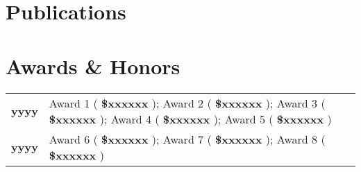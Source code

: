 \documentclass[a4,10pt]{article}
\newcommand{\hskills}[1]{
\textbf{\bfseries #1} }
\begin{document}
\section{Publications} 
\renewcommand\refname{\vskip -1.5em}
\nocite{*}
\printbibliography[heading=none]
\vspace{-0.4cm}



\section{Awards \& Honors}
\vspace{-0.2cm}
\begin{tabular}[t]{ p{4em} p{50em}}
\hskills{yyyy} & Award 1 (\hskills{\$xxxxxx}); Award 2 (\hskills{\$xxxxxx}); Award 3 (\hskills{\$xxxxxx}); Award 4 (\hskills{\$xxxxxx}); Award 5 (\hskills{\$xxxxxx}) \\ %
\hskills{yyyy} & Award 6 (\hskills{\$xxxxxx}); Award 7 (\hskills{\$xxxxxx}); Award 8 (\hskills{\$xxxxxx}) \\
\end{tabular} 

\end{document}
